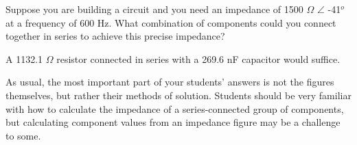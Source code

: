 

Suppose you are building a circuit and you need an impedance of 1500 $\Omega$ $\angle$ -41$^{o}$ at a frequency of 600 Hz.  What combination of components could you connect together in series to achieve this precise impedance?







A 1132.1 $\Omega$ resistor connected in series with a 269.6 nF capacitor would suffice.







As usual, the most important part of your students' answers is not the figures themselves, but rather their methods of solution.  Students should be very familiar with how to calculate the impedance of a series-connected group of components, but calculating component values from an impedance figure may be a challenge to some.



